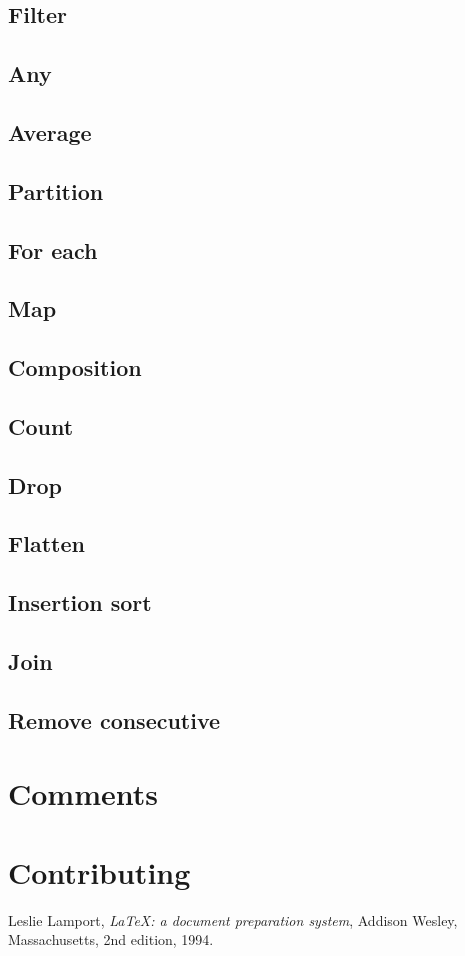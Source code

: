 \documentclass[12pt]{article}
\begin{document}
\subsection*{Filter}


\subsection*{Any}

\subsection*{Average}

\subsection*{Partition}

\subsection*{For each}

\subsection*{Map}

\subsection*{Composition}

\subsection*{Count}

\subsection*{Drop}

\subsection*{Flatten}

\subsection*{Insertion sort}

\subsection*{Join}

\subsection*{Remove consecutive}

\section*{Comments}


\section*{Contributing}



\begin{thebibliography}{9}
  	Leslie Lamport,
	\emph{\LaTeX: a document preparation system},
	Addison Wesley, Massachusetts,
  	2nd edition,
  	1994.
\end{thebibliography}
\end{document}
